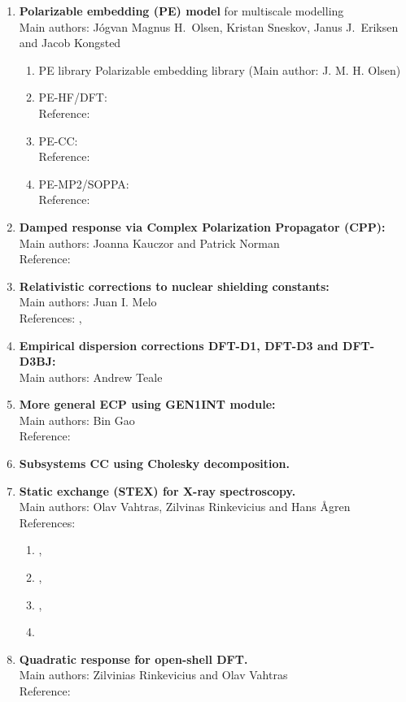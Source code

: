\begin{enumerate}
\item{\bf  Polarizable embedding (PE) model} for multiscale modelling \\
Main authors: J\'{o}gvan Magnus H.\ Olsen, Kristan Sneskov, Janus J.\ Eriksen and Jacob Kongsted
\begin{enumerate}
  \item{PE library} Polarizable embedding library (Main author: J. M. H. Olsen)
  \item{PE-HF/DFT:}  \\
   Reference:  \cite{pescf}
  \item{PE-CC:}  \\
   Reference:  \cite{pecc}
  \item{PE-MP2/SOPPA:}  \\
   Reference:  \cite{pesoppa}
\end{enumerate}
\item{\bf  Damped response via Complex Polarization Propagator (CPP):} \\
Main authors: Joanna Kauczor and Patrick Norman \\
Reference:  \cite{kauczor:2011}
\item{\bf  Relativistic corrections to nuclear shielding constants:}  \\
Main authors: Juan I. Melo \\
 References:   \cite{melojcp03},  \cite{melomaldojcp12}
\item{\bf  Empirical dispersion corrections DFT-D1, DFT-D3 and DFT-D3BJ:}  \\
Main authors: Andrew Teale
\item{\bf  More general ECP using GEN1INT module:} \\
Main authors: Bin Gao \\
 Reference:  \cite{gen1int}
\item{\bf  Subsystems CC using Cholesky decomposition.}
\item{\bf  Static exchange (STEX) for X-ray spectroscopy.} \\
Main authors: Olav Vahtras, Zilvinas Rinkevicius and Hans {\AA}gren\\
References:
\begin{enumerate}
\item {}\cite{niskanencppc13},
\item {}\cite{luopra97},
\item {}\cite{vahtrasjpb97},
\item {}\cite{agrencpl94}
\end{enumerate}
\item{\bf  Quadratic response for open-shell DFT.}\\
Main authors: Zilvinias Rinkevicius and Olav Vahtras\\
Reference:
 \cite{rinkeviciusjctc08}
\end{enumerate}

